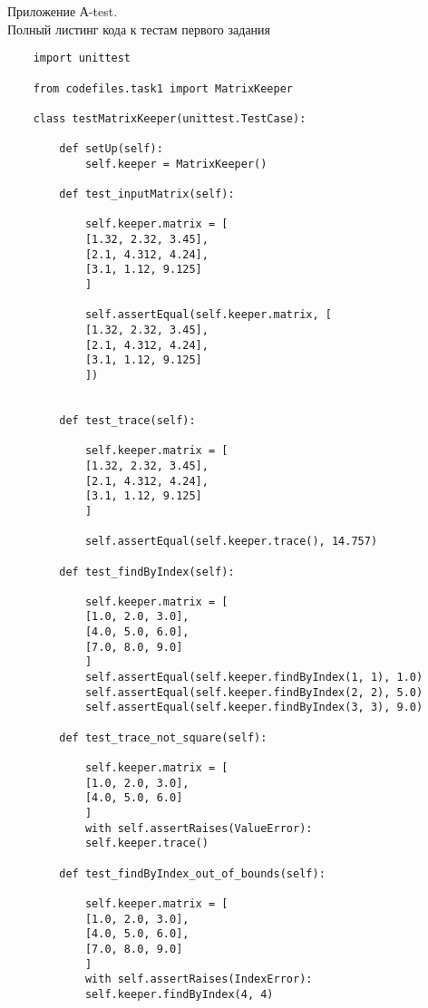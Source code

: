 \centering\begin{large}
	{Приложение А-test.\\
		Полный листинг кода к тестам первого задания}\\
\end{large}
\begin{lstlisting}
	import unittest
	
	from codefiles.task1 import MatrixKeeper
	
	class testMatrixKeeper(unittest.TestCase):
	
		def setUp(self):
			self.keeper = MatrixKeeper()
		
		def test_inputMatrix(self):
		
			self.keeper.matrix = [
			[1.32, 2.32, 3.45],
			[2.1, 4.312, 4.24],
			[3.1, 1.12, 9.125]
			]
			
			self.assertEqual(self.keeper.matrix, [
			[1.32, 2.32, 3.45],
			[2.1, 4.312, 4.24],
			[3.1, 1.12, 9.125]
			])
			
			
		def test_trace(self):
		
			self.keeper.matrix = [
			[1.32, 2.32, 3.45],
			[2.1, 4.312, 4.24],
			[3.1, 1.12, 9.125]
			]
			
			self.assertEqual(self.keeper.trace(), 14.757)
		
		def test_findByIndex(self):
			
			self.keeper.matrix = [
			[1.0, 2.0, 3.0],
			[4.0, 5.0, 6.0],
			[7.0, 8.0, 9.0]
			]
			self.assertEqual(self.keeper.findByIndex(1, 1), 1.0)
			self.assertEqual(self.keeper.findByIndex(2, 2), 5.0)
			self.assertEqual(self.keeper.findByIndex(3, 3), 9.0)
		
		def test_trace_not_square(self):
		
			self.keeper.matrix = [
			[1.0, 2.0, 3.0],
			[4.0, 5.0, 6.0]
			]
			with self.assertRaises(ValueError):
			self.keeper.trace()
		
		def test_findByIndex_out_of_bounds(self):
		
			self.keeper.matrix = [
			[1.0, 2.0, 3.0],
			[4.0, 5.0, 6.0],
			[7.0, 8.0, 9.0]
			]
			with self.assertRaises(IndexError):
			self.keeper.findByIndex(4, 4)
\end{lstlisting}

